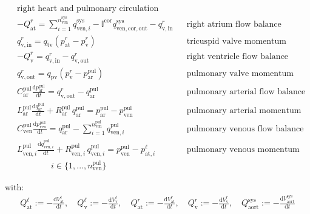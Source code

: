 \documentclass[a4paper,12pt]{report}
\begin{document}
\begin{align}
&\text{right heart and pulmonary circulation} && \nonumber\\
&-Q_{\mathrm{at}}^{r} = \sum\limits_{i=1}^{n_{\mathrm{ven}}^{\mathrm{sys}}}q_{\mathrm{ven},i}^{\mathrm{sys}} - \mathbb{I}^{\mathrm{cor}} q_{\mathrm{ven,cor,out}}^{\mathrm{sys}} - q_{\mathrm{v,in}}^{r} && \text{right atrium flow balance}\nonumber\\
&q_{\mathrm{v,in}}^{r} = q_{\mathrm{tv}}(p_{\mathrm{at}}^{r}-p_{\mathrm{v}}^{r}) && \text{tricuspid valve momentum}\label{eq:tv_flow}\\
&-Q_{\mathrm{v}}^{r} = q_{\mathrm{v,in}}^{r} - q_{\mathrm{v,out}}^{r} && \text{right ventricle flow balance}\nonumber\\
&q_{\mathrm{v,out}}^{r} = q_{\mathrm{pv}}(p_{\mathrm{v}}^{r}-p_{\mathrm{ar}}^{\mathrm{pul}}) && \text{pulmonary valve momentum}\label{eq:pv_flow}\\
&C_{\mathrm{ar}}^{\mathrm{pul}} \frac{\mathrm{d}p_{\mathrm{ar}}^{\mathrm{pul}}}{\mathrm{d}t} = q_{\mathrm{v,out}}^{r} - q_{\mathrm{ar}}^{\mathrm{pul}} && \text{pulmonary arterial flow balance}\nonumber\\
&L_{\mathrm{ar}}^{\mathrm{pul}} \frac{\mathrm{d}q_{\mathrm{ar}}^{\mathrm{pul}}}{\mathrm{d}t} + R_{\mathrm{ar}}^{\mathrm{pul}}\,q_{\mathrm{ar}}^{\mathrm{pul}}=p_{\mathrm{ar}}^{\mathrm{pul}} -p_{\mathrm{ven}}^{\mathrm{pul}} && \text{pulmonary arterial momentum}\nonumber\\
&C_{\mathrm{ven}}^{\mathrm{pul}} \frac{\mathrm{d}p_{\mathrm{ven}}^{\mathrm{pul}}}{\mathrm{d}t} = q_{\mathrm{ar}}^{\mathrm{pul}} - \sum\limits_{i=1}^{n_{\mathrm{ven}}^{\mathrm{pul}}}q_{\mathrm{ven},i}^{\mathrm{pul}} && \text{pulmonary venous flow balance}\nonumber\\
&L_{\mathrm{ven},i}^{\mathrm{pul}} \frac{\mathrm{d}q_{\mathrm{ven},i}^{\mathrm{pul}}}{\mathrm{d}t} + R_{\mathrm{ven},i}^{\mathrm{pul}}\, q_{\mathrm{ven},i}^{\mathrm{pul}}=p_{\mathrm{ven}}^{\mathrm{pul}}-p_{\mathrm{at},i}^{\ell} && \text{pulmonary venous momentum}\nonumber\\
&\qquad\qquad i \in \{1,...,n_{\mathrm{ven}}^{\mathrm{pul}}\} && \nonumber
\end{align}

with:
\begin{align}
Q_{\mathrm{at}}^{\ell} := -\frac{\mathrm{d}V_{\mathrm{at}}^{\ell}}{\mathrm{d}t}, \quad
Q_{\mathrm{v}}^{\ell} := -\frac{\mathrm{d}V_{\mathrm{v}}^{\ell}}{\mathrm{d}t}, \quad
Q_{\mathrm{at}}^{r} := -\frac{\mathrm{d}V_{\mathrm{at}}^{r}}{\mathrm{d}t}, \quad
Q_{\mathrm{v}}^{r} := -\frac{\mathrm{d}V_{\mathrm{v}}^{r}}{\mathrm{d}t},
\quad
Q_{\mathrm{aort}}^{\mathrm{sys}} := -\frac{\mathrm{d}V_{\mathrm{aort}}^{\mathrm{sys}}}{\mathrm{d}t}\nonumber
\end{align}
\end{document}
